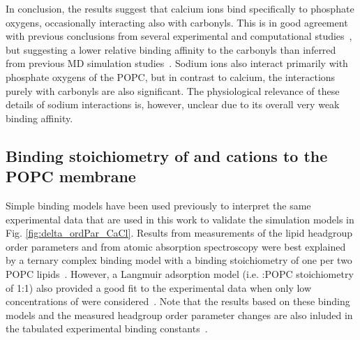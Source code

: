 \documentclass[aip,jcp,twocolumn]{revtex4}
\begin{document}
In conclusion, the results suggest that calcium ions bind specifically to phosphate
oxygens, occasionally interacting also with carbonyls. This is in good agreement
with previous conclusions from several experimental and computational
studies~\cite{hauser76,hauser78,herbette84,cevc90,binder02}, but
suggesting a lower relative binding affinity to the carbonyls than inferred from previous MD simulation
studies~\cite{bockmann03,bockmann04,melcrova16,javanainen17}.
Sodium ions also interact primarily with phosphate oxygens of the POPC, 
but in contrast to calcium, the interactions purely with carbonyls are also significant.
The physiological relevance of these details of sodium interactions is, however, unclear
due to its overall very weak binding affinity.

\subsection{Binding stoichiometry of  and  cations to the POPC membrane}


Simple binding models have been used previously to interpret
the same experimental data \cite{altenbach84,macdonald87} 
that are used in this work to validate the simulation models in Fig. \ref{fig:delta_ordPar_CaCl}.
Results from measurements of the lipid headgroup order parameters and from
atomic absorption spectroscopy were best
explained by a ternary complex binding model with a binding
stoichiometry of one  per two POPC lipids~\cite{altenbach84}.
However, a Langmuir adsorption model (i.e. :POPC stoichiometry of 1:1) 
also provided a good fit to the experimental data when only low concentrations of  were considered~\cite{macdonald87}.
Note that the results based on these binding models and the measured headgroup order parameter changes
are also inluded in the tabulated experimental binding constants~\cite{marsh13}.
\end{document}
